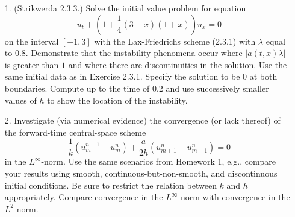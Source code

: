 \documentclass{article}
\providecommand{\abs}[1]{\left\lvert#1\right\rvert}
\begin{document}
\begin{itemize}

\item[1.] (Strikwerda 2.3.3.) Solve the initial value problem for equation
\begin{equation*}
u_t + \left( 1 + \frac{1}{4} \left( 3 - x \right) \left( 1 + x \right) \right) u_x = 0
\end{equation*}
on the interval $[-1,3]$ with the Lax-Friedrichs scheme (2.3.1) with $\lambda$ equal to $0.8$. Demonstrate that the instability phenomena occur where $\abs{a(t,x) \lambda}$ is greater than $1$ and where there are discontinuities in the solution. Use the same initial data as in Exercise 2.3.1. Specify the solution to be $0$ at both boundaries. Compute up to the time of $0.2$ and use successively smaller values of $h$ to show the location of the instability.

\item[2.] Investigate (via numerical evidence) the convergence (or lack thereof) of the forward-time central-space scheme
\begin{equation*}
\frac{1}{k} \left( u^{n+1}_m - u^n_m \right) + \frac{a}{2h} \left( u^n_{m+1} - u^n_{m-1} \right) = 0
\end{equation*}
in the $L^{\infty}$-norm. Use the same scenarios from Homework 1, e.g., compare your results using smooth, continuous-but-non-smooth, and discontinuous initial conditions. Be sure to restrict the relation between $k$ and $h$ appropriately. Compare convergence in the $L^{\infty}$-norm with convergence in the $L^2$-norm.

\end{itemize}
\end{document}
